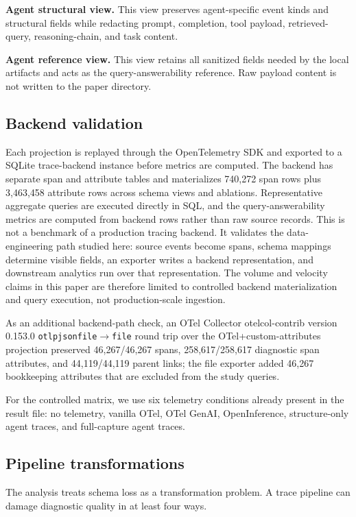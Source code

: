 \documentclass[conference]{IEEEtran}
\begin{document}
\textbf{Agent structural view.} This view preserves agent-specific event
kinds and structural fields while redacting prompt, completion, tool
payload, retrieved-query, reasoning-chain, and task content.

\textbf{Agent reference view.} This view retains all sanitized fields
needed by the local artifacts and acts as the query-answerability
reference. Raw payload content is not written to the paper directory.

\subsection{Backend validation}

Each projection is replayed through the OpenTelemetry SDK and exported
to a SQLite trace-backend instance before metrics are computed. The
backend has separate span and attribute tables and materializes 740,272
span rows plus 3,463,458 attribute rows across schema views and
ablations. Representative aggregate queries are executed directly in
SQL, and the query-answerability metrics are computed from backend rows
rather than raw source records. This is not a benchmark of a production
tracing backend. It validates the data-engineering path studied here:
source events become spans, schema mappings determine visible fields, an
exporter writes a backend representation, and downstream analytics run
over that representation. The volume and velocity claims in this paper
are therefore limited to controlled backend materialization and query
execution, not production-scale ingestion.

As an additional backend-path check, an OTel Collector otelcol-contrib
version 0.153.0 \texttt{otlpjsonfile}$\rightarrow$\texttt{file} round
trip over the OTel+custom-attributes projection preserved 46,267/46,267
spans, 258,617/258,617 diagnostic span attributes, and 44,119/44,119
parent links; the file exporter added 46,267 bookkeeping attributes that
are excluded from the study queries.

For the controlled matrix, we use six telemetry conditions already
present in the result file: no telemetry, vanilla OTel, OTel GenAI,
OpenInference, structure-only agent traces, and full-capture agent
traces.

\subsection{Pipeline transformations}

The analysis treats schema loss as a transformation problem. A trace
pipeline can damage diagnostic quality in at least four ways.
\end{document}
